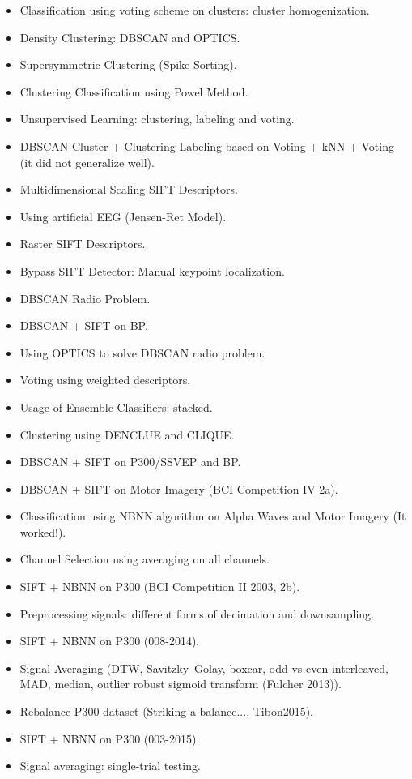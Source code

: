 \begin{itemize}
\item Classification using voting scheme on clusters:  cluster homogenization.
\item Density Clustering: DBSCAN and OPTICS.
\item Supersymmetric Clustering (Spike Sorting).
\item Clustering Classification using Powel Method.
\item Unsupervised Learning: clustering, labeling and voting.
\item DBSCAN Cluster + Clustering Labeling based on Voting + kNN + Voting (it did not generalize well).
\item Multidimensional Scaling SIFT Descriptors.
\item Using artificial EEG (Jensen-Ret Model).
\item Raster SIFT Descriptors.
\item Bypass SIFT Detector: Manual keypoint localization.
\item DBSCAN Radio Problem.
\item DBSCAN + SIFT on BP.
\item Using OPTICS to solve DBSCAN radio problem.
\item Voting using weighted descriptors.
\item Usage of Ensemble Classifiers: stacked.
\item Clustering using DENCLUE and CLIQUE.
\item DBSCAN + SIFT on P300/SSVEP and BP.
\item DBSCAN + SIFT on Motor Imagery (BCI Competition IV 2a).
\item Classification using NBNN algorithm on Alpha Waves and Motor Imagery (It worked!).
\item Channel Selection using averaging on all channels.
\item SIFT + NBNN on P300 (BCI Competition II 2003, 2b).
\item Preprocessing signals: different forms of decimation and downsampling.
\item SIFT + NBNN on P300 (008-2014).
\item Signal Averaging (DTW, Savitzky–Golay, boxcar, odd vs even interleaved, MAD, median, outlier robust sigmoid transform (Fulcher 2013)).
\item Rebalance P300 dataset (Striking a balance..., Tibon2015).
\item SIFT + NBNN on P300 (003-2015).
\item Signal averaging: single-trial testing.

\end{itemize}

